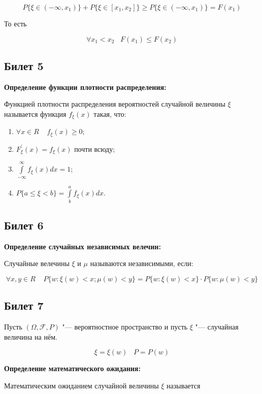 \[
    P\{\xi \in (-\infty, x_1)\} + P\{\xi \in [x_1, x_2]\} \geq
    P\{\xi \in (-\infty, x_1)\} = F(x_1)
\]

То есть

\[
    \forall x_1 < x_2 \;\;\; F(x_1) \leq F(x_2)  
\]
\bigskip

\subsection{Билет 5}

\textbf{Определение функции плотности
распределения:}
\smallskip

Функцией плотности распределения вероятностей
случайной величины $\xi$ называется функция
$f_{\xi}(x)$ такая, что:

\begin{enumerate}
    \item{$\forall x \in R \;\;\;\; f_{\xi}
    (x) \geq 0$;}
    \item{$F_{\xi}^{'}(x) = f_{\xi}(x)$ почти всюду;}
    \item{$\int\limits_{-\infty}^{\infty} f_{\xi}(x)
    dx = 1$;}
    \item{$P\{a \leq \xi < b\} = \int\limits_b^{a}
    f_{\xi}(x) dx$.}
\end{enumerate}
\bigskip        

\subsection{Билет 6}

\textbf{Определение случайных независимых
велечин:}
\smallskip

Случайные велечины $\xi$ и $\mu$ называются
независимыми, если:

\[ 
    \forall x, y \in R \;\;\;\; P\{w : \xi(w)
    < x; \mu (w) < y\} = P\{w: \xi (w) < x\} \cdot
    P\{w : \mu (w) < y\}
\]
\bigskip

\subsection{Билет 7}

Пусть $(\Omega, \mathcal{F}, P)$ "--- вероятностное пространство
и пусть $\xi$ "--- случайная величина на нём.

\[
\xi = \xi(w) \;\;\; P = P(w)
\]
\bigskip

\textbf{Определение математического ожидания:}
\smallskip

Математическим ожиданием случайной величины $\xi$ называется

